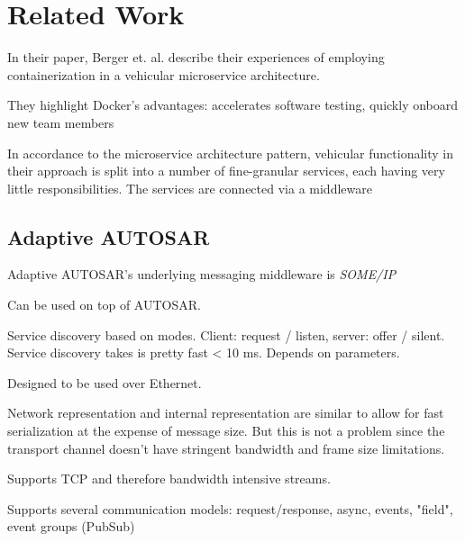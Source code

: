 \chapter{Related Work}\label{chapter:related-work}

In their paper, Berger et. al. \cite{berger2017containerized} describe their experiences of employing containerization in a vehicular microservice architecture. 

They highlight Docker's advantages: accelerates software testing, quickly onboard new team members

In accordance to the microservice architecture pattern, vehicular functionality in their approach is split into a number of fine-granular services, each having very little responsibilities. The services are connected via a middleware



\section{Adaptive AUTOSAR}

Adaptive AUTOSAR's underlying messaging middleware is \emph{SOME/IP}

Can be used on top of AUTOSAR.

Service discovery based on modes. Client: request / listen, server: offer / silent.
Service discovery takes is pretty fast < 10 ms. Depends on parameters.

Designed to be used over Ethernet.

Network representation and internal representation are similar to allow for fast serialization at the expense of message size. But this is not a problem since the transport channel doesn't have stringent bandwidth and frame size limitations.

Supports TCP and therefore bandwidth intensive streams.

Supports several communication models: request/response, async, events, "field", event groups (PubSub)